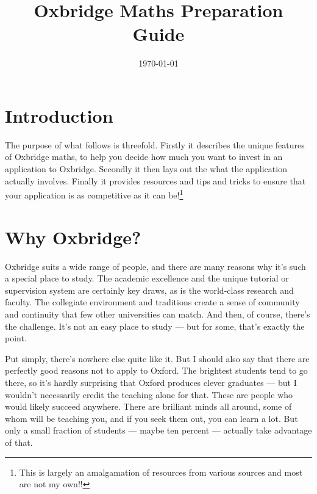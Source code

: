 \documentclass[11pt]{article}
\title{\textbf{Oxbridge Maths Preparation Guide}}
\date{\today}
\newif\ifshowcomments
\newif\ifshowpersonal
\newcommand{\studentname}{Anonymous}
\renewcommand{\studentname}{Aarna}
\newcommand{\comment}[1]{\ifshowcomments\textcolor{myblue}{\textbf{#1}}\fi}
\newcommand{\personal}[1]{\ifshowpersonal\textcolor{myorange}{\emph{#1}}\fi}
\begin{document}
\maketitle

\bigskip

\section{Introduction}
\noindent
The purpose of what follows is threefold. Firstly it describes the unique features of Oxbridge maths, to help you decide how much you want to invest in an application to Oxbridge. Secondly it then lays out the what the application actually involves. Finally it provides resources and tips and tricks to ensure that your application is as competitive as it can be!\footnote{This is largely an amalgamation of resources from various sources and most are not my own!!}  

\ifshowcomments
To make it a bit more personable I've added comments specific to you \comment{(\studentname)} in \comment{bold}.
\fi
\ifshowpersonal 
Comments on what my own experience was like are in \personal{italics}.
\fi


\section{Why Oxbridge?}

Oxbridge suits a wide range of people, and there are many reasons why it’s such a special place to study. The academic excellence and the unique tutorial or supervision system are certainly key draws, as is the world-class research and faculty. The collegiate environment and traditions create a sense of community and continuity that few other universities can match. And then, of course, there’s the challenge. It’s not an easy place to study — but for some, that’s exactly the point.

Put simply, there’s nowhere else quite like it. But I should also say that there are perfectly good reasons not to apply to Oxford. The brightest students tend to go there, so it’s hardly surprising that Oxford produces clever graduates — but I wouldn’t necessarily credit the teaching alone for that. These are people who would likely succeed anywhere. There are brilliant minds all around, some of whom will be teaching you, and if you seek them out, you can learn a lot. But only a small fraction of students — maybe ten percent — actually take advantage of that.
\end{document}
